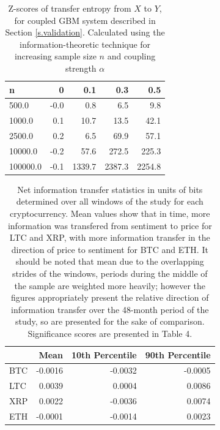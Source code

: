 \documentclass[]{rsos}%
\begin{document}
  
  \begin{table}[!htb]
    \label{t.table2}
    \caption{ Z-scores of transfer entropy from $X$ to $Y$, for coupled GBM system described in Section \ref{s.validation}. Calculated using the information-theoretic technique for increasing sample size $n$ and coupling strength $\alpha$}
    
      \begin{tabular}{lrrrr}

    n       &         0 &       0.1 &       0.3 &       0.5 \\
    \hline 
    500.0    & -0.0 &     0.8 &     6.5 &     9.8 \\
    1000.0   &  0.1 &    10.7 &    13.5 &    42.1 \\
    2500.0   &  0.2 &     6.5 &    69.9 &    57.1 \\
    10000.0  & -0.2 &    57.6 &   272.5 &   225.3 \\
    100000.0 & -0.1 &  1339.7 &  2387.3 &  2254.8 \\

    \end{tabular}
    
  \end{table}

  \begin{table}[!htb]
    \label{t.table3}
    \caption{ Net information transfer statistics in units of bits determined over all windows of the study for each cryptocurrency. Mean values show that in time, more information was transfered from sentiment to price for LTC and XRP, with more information transfer in the direction of price to sentiment for BTC and ETH. It should be noted that mean due to the overlapping strides of the windows, periods during the middle of the sample are weighted more heavily; however the figures appropriately present the relative direction of information transfer over the 48-month period of the study, so are presented for the sake of comparison. Significance scores are presented in Table {\color{blue}4}.}

    
    \begin{tabular}{lrrr}
     {} &    Mean &  10th Percentile &  90th Percentile \\
     \hline 
     BTC & -0.0016 &          -0.0032 &          -0.0005 \\
     LTC &  0.0039 &           0.0004 &           0.0086 \\
     XRP &  0.0022 &          -0.0036 &           0.0074 \\
     ETH & -0.0001 &          -0.0014 &           0.0023 \\
    \end{tabular}
  
  \end{table}
\end{document}

